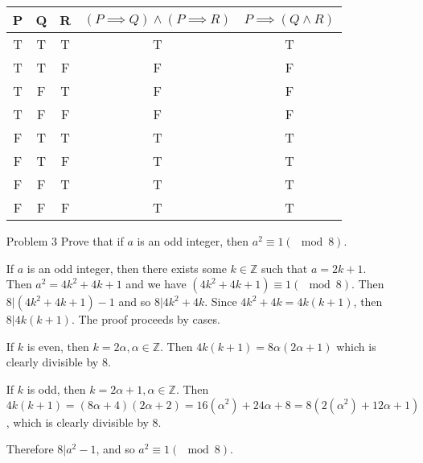 \documentclass[12pt, oneside]{article}
\newcommand{\Integers}{\mathbb{Z}}
\begin{document}
\begin{itemize}
          \begin{center}
              \begin{tabular}{ c|c|c|c|c}
                  P & Q & R & \((P \implies Q) \wedge (P \implies R)\) & \(P \implies (Q \wedge R)\) \\
                  \hline
                  T & T & T & T                                        & T                           \\
                  T & T & F & F                                        & F                           \\
                  T & F & T & F                                        & F                           \\
                  T & F & F & F                                        & F                           \\
                  F & T & T & T                                        & T                           \\
                  F & T & F & T                                        & T                           \\
                  F & F & T & T                                        & T                           \\
                  F & F & F & T                                        & T                           \\
              \end{tabular}
          \end{center}
    \item[Problem 3] Prove that if \(a\) is an odd integer, then \(a^2 \equiv 1 (\mod 8)\).

          If \(a\) is an odd integer, then there exists some \(k \in \Integers\) such that \(a = 2k + 1\). Then \(a^2 = 4k^2 + 4k + 1\) and we have \((4k^2 + 4k + 1) \equiv 1 (\mod 8)\). Then \(8|(4k^2 + 4k + 1) - 1\) and so \(8| 4k^2 + 4k\). Since \(4k^2 + 4k = 4k(k + 1)\), then \(8|4k(k + 1)\). The proof proceeds by cases.

          If \(k\) is even, then \(k = 2\alpha, \alpha \in \Integers\). Then \(4k(k + 1) = 8\alpha(2\alpha + 1)\) which is clearly divisible by \(8\).

          If \(k\) is odd, then \(k = 2\alpha + 1, \alpha \in \Integers\). Then \(4k(k + 1) = (8\alpha + 4)(2\alpha+2) = 16(\alpha^2) + 24\alpha + 8 = 8(2(\alpha^2) + 12\alpha + 1)\), which is clearly divisible by 8.

          Therefore \(8 | a^2 - 1 \), and so \(a^2 \equiv 1 (\mod 8)\).


\end{itemize}
\end{document}
